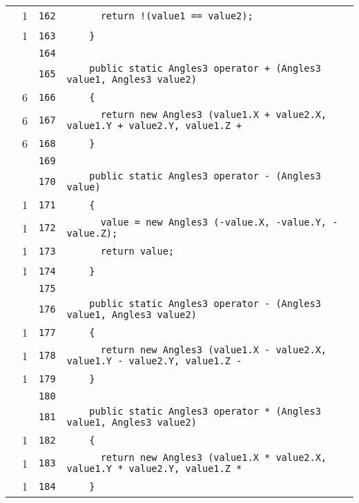 \documentclass[a4paper,10pt]{article}
\begin{document}
\begin{longtable}[l]{lrrl}
\cellcolor{green} & 1 & \verb~162~ & \verb~      return !(value1 == value2);~\\
\cellcolor{green} & 1 & \verb~163~ & \verb~    }~\\
\cellcolor{gray} &  & \verb~164~ & \verb~~\\
\cellcolor{gray} &  & \verb~165~ & \verb~    public static Angles3 operator + (Angles3 value1, Angles3 value2)~\\
\cellcolor{green} & 6 & \verb~166~ & \verb~    {~\\
\cellcolor{green} & 6 & \verb~167~ & \verb~      return new Angles3 (value1.X + value2.X, value1.Y + value2.Y, value1.Z +~\\
\cellcolor{green} & 6 & \verb~168~ & \verb~    }~\\
\cellcolor{gray} &  & \verb~169~ & \verb~~\\
\cellcolor{gray} &  & \verb~170~ & \verb~    public static Angles3 operator - (Angles3 value)~\\
\cellcolor{green} & 1 & \verb~171~ & \verb~    {~\\
\cellcolor{green} & 1 & \verb~172~ & \verb~      value = new Angles3 (-value.X, -value.Y, -value.Z);~\\
\cellcolor{green} & 1 & \verb~173~ & \verb~      return value;~\\
\cellcolor{green} & 1 & \verb~174~ & \verb~    }~\\
\cellcolor{gray} &  & \verb~175~ & \verb~~\\
\cellcolor{gray} &  & \verb~176~ & \verb~    public static Angles3 operator - (Angles3 value1, Angles3 value2)~\\
\cellcolor{green} & 1 & \verb~177~ & \verb~    {~\\
\cellcolor{green} & 1 & \verb~178~ & \verb~      return new Angles3 (value1.X - value2.X, value1.Y - value2.Y, value1.Z -~\\
\cellcolor{green} & 1 & \verb~179~ & \verb~    }~\\
\cellcolor{gray} &  & \verb~180~ & \verb~~\\
\cellcolor{gray} &  & \verb~181~ & \verb~    public static Angles3 operator * (Angles3 value1, Angles3 value2)~\\
\cellcolor{green} & 1 & \verb~182~ & \verb~    {~\\
\cellcolor{green} & 1 & \verb~183~ & \verb~      return new Angles3 (value1.X * value2.X, value1.Y * value2.Y, value1.Z *~\\
\cellcolor{green} & 1 & \verb~184~ & \verb~    }~\\

\end{longtable}
\end{document}
